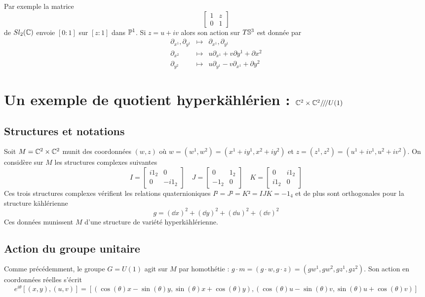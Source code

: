 \documentclass[a4paper,draft]{amsart}
\begin{document}
Par exemple la matrice
\[
\begin{bmatrix}
1 & z\\
0 & 1
\end{bmatrix}
\]
de $Sl_2(\C)$ envoie $[0:1]$ sur $[z:1]$ dans $\Pro^1$. Si $z=u+iv$ alors son action sur $T\S^3$ est donnée par
\begin{eqnarray*}
\partial_{x^1}, \partial_{y^1} & \mapsto & \partial_{x^1}, \partial_{y^1}\\
\partial_{x^2} & \mapsto & u\partial_{x^1}+v\partial{y^1} + \partial{x^2}\\
\partial_{y^2} & \mapsto & u\partial_{y^1}-v \partial_{x^1}+ \partial{y^2}
\end{eqnarray*}
\section{Un exemple de quotient hyperkählérien : $\C^2 \times \C^2/\!/\!/U(1)$}
\subsection{Structures et notations}
Soit $M = \C^2 \times \C^2$ munit des coordonnées $(w,z)$ où $w = (w^1,w^2) = (x^1 + i y^1, x^2 + i y^2)$ et $z = (z^1,z^2) = (u^1 + i v^1, u^2 + i v^2)$.
On considère sur $M$ les structures complexes suivantes
\[
I = 
\begin{bmatrix}
i1_2 & 0 \\
0 & -i1_2
\end{bmatrix}
\quad
J = 
\begin{bmatrix}
0 & 1_2 \\
-1_2 & 0
\end{bmatrix}
\quad
K = 
\begin{bmatrix}
0 & i1_2 \\
i1_2 & 0
\end{bmatrix}
\]
Ces trois structures complexes vérifient les relations quaternioniques $I² = J² = K² = IJK = -1_4$ et de plus sont orthogonales pour la structure kählérienne
\[
g = (\dd x)^2 + (\dd y)^2 + (\dd u)^2 + (\dd v)^2
\]
Ces données munissent $M$ d'une structure de variété hyperkählérienne.

\subsection{Action du groupe unitaire}
Comme précédemment, le groupe $G = U(1)$ agit sur $M$ par homothétie : $g\cdot m = (g \cdot w, g \cdot z) = (gw^1,gw^2,gz^1,gz^2)$.
Son action en coordonnées réelles s'écrit
\[
e^{i\theta}[(x,y),(u,v)] = \left[(\cos(\theta)x-\sin(\theta)y,\sin(\theta)x+\cos(\theta)y),(\cos(\theta)u-\sin(\theta)v,\sin(\theta)u+\cos(\theta)v)\right]
\]
\end{document}
